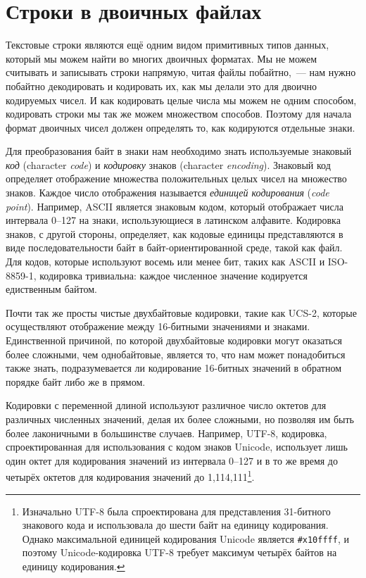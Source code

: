 \section{Строки в двоичных файлах}

Текстовые строки являются ещё одним видом примитивных типов данных, который мы можем найти
во многих двоичных форматах. Мы не можем считывать и записывать строки напрямую, читая
файлы побайтно,~--- нам нужно побайтно декодировать и кодировать их, как мы делали это для
двоично кодируемых чисел. И как кодировать целые числа мы можем не одним способом,
кодировать строки мы так же можем множеством способов. Поэтому для начала формат двоичных
чисел должен определять то, как кодируются отдельные знаки.

Для преобразования байт в знаки нам необходимо знать используемые знаковый \textit{код}
(character \textit{code}) и \textit{кодировку} знаков (character
\textit{encoding}). Знаковый код определяет отображение множества положительных целых
чисел на множество знаков. Каждое число отображения называется \textit{единицей
  кодирования} (\textit{code point}). Например, ASCII является знаковым кодом, который
отображает числа интервала 0--127 на знаки, исполь\-зую\-щие\-ся в латинском алфавите. Кодировка
знаков, с другой стороны, определяет, как кодовые единицы представляются в виде
последовательности байт в байт-ориентированной среде, такой как файл. Для кодов, которые
используют восемь или менее бит, таких как ASCII и ISO-8859-1, кодировка тривиальна:
каждое численное значение кодируется едиственным байтом.

Почти так же просты чистые двухбайтовые кодировки, такие как UCS-2, которые осуществляют
отображение между 16-битными значениями и знаками. Единственной причиной, по которой
двухбайтовые кодировки могут оказаться более сложными, чем однобайтовые, является то, что
нам может понадобиться также знать, подразумевается ли кодирование 16-битных значений в
обратном порядке байт либо же в прямом.

Кодировки с переменной длиной используют различное число октетов для различных численных
значений, делая их более сложными, но позволяя им быть более лаконичными в большинстве
случаев. Например, UTF-8, кодировка, спроектированная для использования с кодом знаков
Unicode, использует лишь один октет для кодирования значений из интервала 0--127 и в то же
время до четырёх октетов для кодирования значений до 1,114,111\footnote{Изначально UTF-8
  была спроектирована для представления 31-битного знакового кода и использовала до шести
  байт на единицу кодирования. Однако максимальной единицей кодирования Unicode является
  \lstinline!#x10ffff!, и поэтому Unicode-кодировка UTF-8 требует максимум четырёх байтов на
  единицу кодирования.}.

